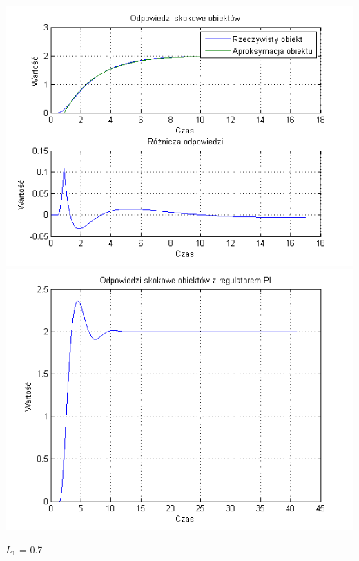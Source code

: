 \documentclass[10pt,a4paper]{article}
\begin{document}
\begin{center}
\includegraphics[scale=1]{images/jeden/skrypt_181.png}\\
\includegraphics[scale=1]{images/jeden/skrypt_182.png}\\
\end{center}
\newpage
$L_1$ = 0.7
\end{document}
